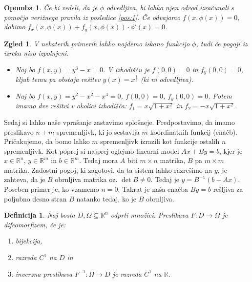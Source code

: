 \documentclass[10pt, a4paper]{article}
\newtheorem{defi}{Definicija}[section]
\newenvironment{noticeB}{%
  \tcolorbox[%
  notitle,
  empty,
  enhanced,  %
  breakable,
  coltext=black,
  colback=white, 
  fontupper=\rmfamily,
  parbox=false,
  noparskip,
  sharp corners,
  boxrule=-1pt,  %
  frame hidden,
  left=7pt,  %
  right=7pt,
  top=5pt,
  bottom=5pt,
  before skip=2.5ex plus 2pt,
  after skip=2.5ex plus 2pt,
  borderline west = {1.5pt}{-0.1pt}{blue!30!black}, %
  overlay unbroken and last={%
    \draw[color=black, line width=1.25pt]
    ($(frame.south west)+(1.pt, -0.1pt)$) -- ++(2em, 0);
  }
  ]}
{\endtcolorbox}
\newenvironment{definicija}{\begin{defi}\begin{noticeB}}{%
    \end{noticeB}\end{defi}}
\newtheorem*{opomba}{Opomba}
\newtheorem{zgled}{Zgled}[section]
\newcommand{\R}{\mathbb {R}}
\begin{document}
\begin{opomba}
    Če bi vedeli, da je $\phi$ odvedljiva, bi lahko njen odvod izračunali s pomočjo verižnega pravila iz posledice \ref{pos:1}.
    Če odvajamo $f(x, \phi(x)) = 0$, dobimo $f_x (x, \phi(x)) + f_y (x, \phi(x)) \cdot \phi'(x) = 0$.
\end{opomba}

\begin{zgled}
    V nekaterih primerih lahko najdemo iskano funkcijo $\phi$, tudi če pogoji iz izreka niso izpolnjeni.
    \begin{itemize}
        \item Naj bo $f(x, y) = y^3 - x = 0$. V izhodišču je $f(0,0) = 0$ in $f_y (0,0) = 0$,
        kljub temu pa obstaja rešitev $y (x) = x^\frac{1}{3}$ (ki ni odvedljiva).
        \item Naj bo $f(x, y) = y^2 - x^2 - x^4 = 0$, $f(0,0) = 0$, $f_y (0,0) = 0$.
        Potem imamo dve rešitvi v okolici izhodišča: $f_1 = x \sqrt{1 + x^2}$ in $f_2 = - x \sqrt{1 + x^2}$.
    \end{itemize}
\end{zgled}

Sedaj si lahko naše vprašanje zastavimo splošneje.
Predpostavimo, da imamo preslikavo $n + m$ spremenljivk,
ki jo sestavlja $m$ koordinatnih funkcij (enačb).
Pričakujemo, da bomo lahko $m$ spremenljivk izrazili kot funkcije ostalih $n$ spremenljivk.
Kot poprej si najprej oglejmo linearni model $Ax + By = b$, kjer je $x \in \R^n$, $y \in \R^m$ in $b \in \R^m$.
Tedaj mora $A$ biti $m \times n$ matrika, $B$ pa $m \times m$ matrika.
Zadostni pogoj, ki zagotovi, da ta sistem lahko razrešimo na $y$, je zahteva, da je $B$ obrnljiva matrika
oz. $\det B \neq 0$. Tedaj je $y = B^{-1} (b - Ax)$.
Poseben primer je, ko vzamemo $n = 0$.
Takrat je naša enačba $By = b$ rešljiva za poljubno desno stran $B$ natanko tedaj, ko je $B$ obrnljiva.

\begin{definicija}
    Naj bosta $D, \Omega \subseteq \R^n$ odprti množici. Preslikava $F: D \rightarrow \Omega$
    je difeomorfizem, če je:
    \begin{enumerate}
        \item bijekcija,
        \item razreda $C^1$ na $D$ in 
        \item inverzna preslikava $F^{-1} :\Omega \to D$ je razreda $C^1$ na $\R$.
    \end{enumerate}
\end{definicija}
\end{document}
